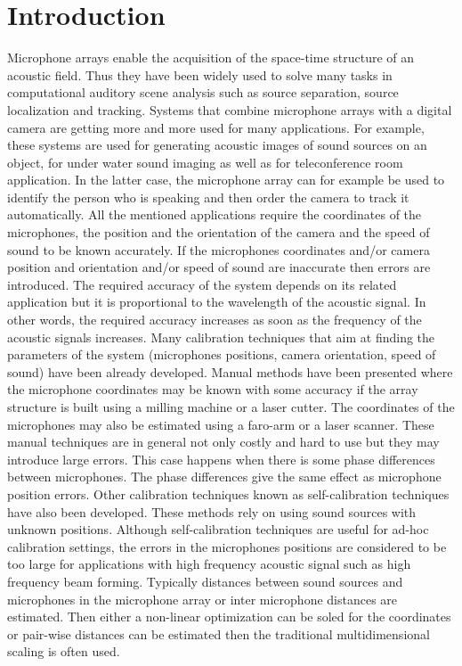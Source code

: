 \section{Introduction}
Microphone arrays enable the acquisition of the space-time structure of an acoustic field. Thus they have been widely used to solve many tasks in computational auditory scene analysis such as source separation, source localization and tracking.
Systems that combine microphone arrays with a digital camera are getting more and more used for many applications.
For example, these systems are used for generating acoustic images of sound sources on an object, for under water sound imaging as well as for teleconference room application. In the latter case, the microphone array can for example be used to identify the person who is speaking and then order the camera to track it automatically.
All the mentioned applications require the coordinates of the microphones, the position and the orientation of the camera and the speed of sound to be known accurately.
If the microphones coordinates and/or camera position and orientation and/or speed of sound are inaccurate then errors are introduced.
The required accuracy of the system depends on its related application but it is proportional to the wavelength of the acoustic signal. In other words, the required accuracy increases as soon as the frequency of the acoustic signals increases.
Many calibration techniques that aim at finding the parameters of the system (microphones positions, camera orientation, speed of sound) have been already developed. Manual methods have been presented where the microphone coordinates may be known with some accuracy if the array structure is built using a milling machine or a laser cutter. The coordinates of the microphones may also be estimated using a faro-arm or a laser scanner.
These manual techniques are in general not only costly and hard to use but they may introduce large errors. This case happens when there is some phase differences between microphones. The phase differences give the same effect as microphone position errors.
Other calibration techniques known as self-calibration techniques have also been developed. These methods rely on using sound sources with unknown positions. Although self-calibration techniques are useful for ad-hoc calibration settings, the errors in the microphones positions are considered to be too large for applications with high frequency acoustic signal such as high frequency beam forming.
Typically distances between sound sources and microphones in the microphone array or inter microphone distances are estimated. Then either a non-linear optimization can be soled for the coordinates or pair-wise distances can be estimated then the traditional multidimensional scaling is often used.
